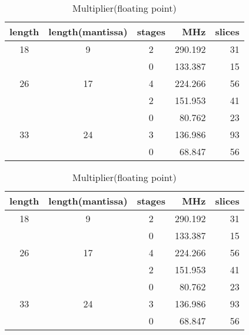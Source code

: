 \documentclass{llncs}
\begin{document}
\begin{table}
  \begin{center}
    \begin{minipage}{.45\linewidth}
      \caption{Multiplier(floating point)}
      \begin{center}
	\begin{tabular}{cccrr}
	  \hline
	  length  & length(mantissa) & stages & MHz & slices\\
	  \hline
	  18   &  9 & 2 & 290.192 &  31 \\
	  &    & 0 & 133.387 &  15 \\
	  \hline
	  26   & 17 & 4 & 224.266 &  56 \\
	  &    & 2 & 151.953 &  41 \\
	  &    & 0 &  80.762 &  23 \\
	  \hline
	  33   & 24 & 3 & 136.986 &  93 \\
	  &    & 0 &  68.847 &  56\\
	  \hline
	\end{tabular}
      \end{center}
      \label{tabpg_float_mult}
    \end{minipage}
    \hspace{2.4pc}
    \begin{minipage}{.45\linewidth}
      \caption{Multiplier(floating point)}
      \begin{center}
	\begin{tabular}{cccrr}
	  \hline
	  length  & length(mantissa) & stages & MHz & slices\\
	  \hline
	  18   &  9 & 2 & 290.192 &  31 \\
	  &    & 0 & 133.387 &  15 \\
	  \hline
	  26   & 17 & 4 & 224.266 &  56 \\
	  &    & 2 & 151.953 &  41 \\
	  &    & 0 &  80.762 &  23 \\
	  \hline
	  33   & 24 & 3 & 136.986 &  93 \\
	  &    & 0 &  68.847 &  56\\
	  \hline
	\end{tabular}
      \end{center}
      \label{tabpg_float_mult}
    \end{minipage}
  \end{center}


\end{table}
\end{document}
